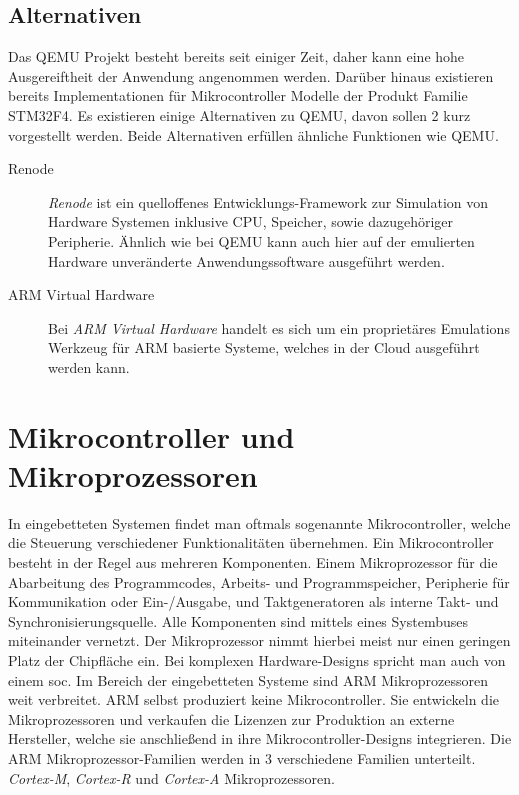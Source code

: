 \subsection{Alternativen}

Das QEMU Projekt besteht bereits seit einiger Zeit, daher kann eine hohe
Ausgereiftheit der Anwendung angenommen werden.
Darüber hinaus existieren bereits Implementationen für Mikrocontroller Modelle
der Produkt Familie STM32F4.
Es existieren einige Alternativen zu QEMU, davon sollen 2 kurz vorgestellt
werden.
Beide Alternativen erfüllen ähnliche Funktionen wie QEMU.
\begin{description}
    \item[Renode]
    \textit{Renode} ist ein quelloffenes Entwicklungs-Framework zur Simulation
    von Hardware Systemen inklusive CPU, Speicher, sowie dazugehöriger
    Peripherie\cite{RenodeAbout}.
    Ähnlich wie bei QEMU kann auch hier auf der emulierten Hardware
    unveränderte Anwendungssoftware ausgeführt werden.
    \item[ARM Virtual Hardware]
    Bei \textit{ARM Virtual Hardware} handelt es sich um ein proprietäres
    Emulations Werkzeug für ARM basierte Systeme, welches in der Cloud
        ausgeführt werden kann\cite{ArmVirtualHwAbout}.
\end{description}


\section{Mikrocontroller und Mikroprozessoren}

In eingebetteten Systemen findet man oftmals sogenannte Mikrocontroller, welche
die Steuerung verschiedener Funktionalitäten übernehmen.
Ein Mikrocontroller besteht in der Regel aus mehreren Komponenten.
Einem Mikroprozessor für die Abarbeitung des Programmcodes, Arbeits- und
Programmspeicher, Peripherie für Kommunikation oder Ein-/Ausgabe, und
Taktgeneratoren als interne Takt- und Synchronisierungsquelle.
Alle Komponenten sind mittels eines Systembuses miteinander
vernetzt\cite{DefGuideCM34_JYiu}.
Der Mikroprozessor nimmt hierbei meist nur einen geringen Platz der Chipfläche
ein.
Bei komplexen Hardware-Designs spricht man auch von einem \ac{soc}.
\newline %
Im Bereich der eingebetteten Systeme sind ARM Mikroprozessoren weit verbreitet.
ARM selbst produziert keine Mikrocontroller.
Sie entwickeln die Mikroprozessoren und verkaufen die Lizenzen zur Produktion
an externe Hersteller, welche sie anschließend in ihre Mikrocontroller-Designs
integrieren.
\newline
Die ARM Mikroprozessor-Familien werden in 3 verschiedene Familien unterteilt.
\textit{Cortex-M}, \textit{Cortex-R} und \textit{Cortex-A} Mikroprozessoren.


